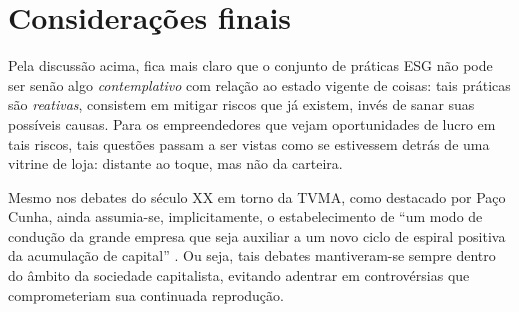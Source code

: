 \documentclass[12pt]{article}
\numberwithin{equation}{section}
\theoremstyle{plain}
\theoremstyle{definition}
\theoremstyle{remark}
\begin{document}


\section{Considerações finais}
Pela discussão acima, fica mais claro que o conjunto de práticas ESG não pode ser senão algo \textit{contemplativo} com relação ao estado vigente de coisas: tais práticas são \textit{reativas}, consistem em mitigar riscos que já existem, invés de sanar suas possíveis causas. 
Para os empreendedores que vejam oportunidades de lucro em tais riscos, tais questões passam a ser vistas como se estivessem detrás de uma vitrine de loja: distante ao toque, mas não da carteira. 

Mesmo nos debates do século XX em torno da TVMA, como destacado por Paço Cunha, ainda assumia-se, implicitamente, o estabelecimento de ``um modo de condução da grande empresa que seja auxiliar a um novo ciclo de espiral positiva da acumulação de capital'' \parencite[p. 118]{PacoCunha2025}. Ou seja, tais debates mantiveram-se sempre dentro do âmbito da sociedade capitalista, evitando adentrar em controvérsias que comprometeriam sua continuada reprodução. 
\end{document}
